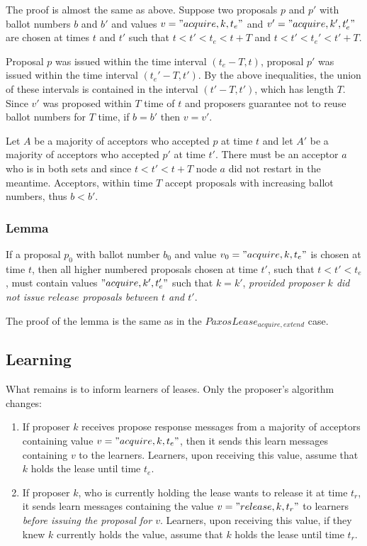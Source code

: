 \documentclass[12pt]{article}
\begin{document}
The proof is almost the same as above. Suppose two proposals $p$ and $p'$ with ballot numbers $b$ and $b'$ and values $v = "acquire, k, t_e"$ and $v' = "acquire, k', t_e'"$ are chosen at times $t$ and $t'$ such that $t < t' < t_e < t + T$ and $t < t' < t_e' < t' + T$.

Proposal $p$ was issued within the time interval $(t_e - T, t)$, proposal $p'$ was issued within the time interval $(t_e' - T, t')$. By the above inequalities, the union of these intervals is contained in the interval $(t' - T, t')$, which has length $T$. Since $v'$ was proposed within $T$ time of $t$ and proposers guarantee not to reuse ballot numbers for $T$ time, if $b = b'$ then $v = v'$.

Let $A$ be a majority of acceptors who accepted $p$ at time $t$ and let $A'$ be a majority of acceptors who accepted $p'$ at time $t'$.  There must be an acceptor $a$ who is in both sets and since $t < t' < t + T$ node $a$ did not restart in the meantime. Acceptors, within time $T$ accept proposals with increasing ballot numbers, thus $b < b'$.

\subsubsection{ Lemma } If a proposal $p_0$ with ballot number $b_0$ and value $v_0 = "acquire, k, t_e"$ is chosen at time $t$, then all higher numbered proposals chosen at time $t'$, such that $t < t' < t_e$, must contain values $"acquire, k', t_e'"$ such that $k = k'$, \emph{provided proposer $k$ did not issue $release$ proposals between $t$ and $t'$}.

The proof of the lemma is the same as in the $PaxosLease_{acquire, extend}$ case.

\subsection{ Learning }

What remains is to inform learners of leases. Only the proposer's algorithm changes:

\begin{enumerate}

\item If proposer $k$ receives propose response messages from a majority of acceptors containing value $v = "acquire, k, t_e"$, then it sends this learn messages containing $v$ to the learners. Learners, upon receiving this value, assume that $k$ holds the lease until time $t_e$.

\item If proposer $k$, who is currently holding the lease wants to release it at time $t_r$, it sends learn messages containing the value $v = "release, k, t_r"$ to learners \emph{before issuing the proposal for $v$}. Learners, upon receiving this value, if they knew $k$ currently holds the value, assume that $k$ holds the lease until time $t_r$.

\end{enumerate}
\end{document}

